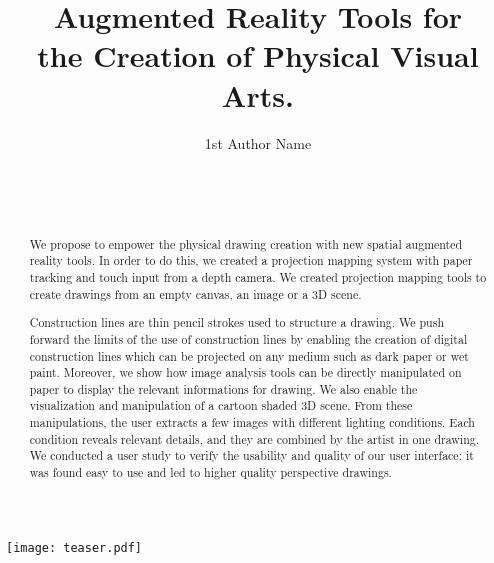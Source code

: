 \documentclass{sigchi}
\begin{document}
\title{Augmented Reality Tools for \\ 
  the Creation of Physical Visual Arts.}

\author{
  \alignauthor 1st Author Name\\
    \\
    \\
    \\
}









\maketitle
 

\vspace{55mm}
\texttt{[image: teaser.pdf]}

\begin{abstract}


We propose to empower the physical drawing creation with 
new spatial augmented reality tools. In order to do this, we created a
projection mapping system with paper tracking and touch input from a
depth camera. We created projection mapping tools to create drawings from
an empty canvas, an image or a 3D scene.

Construction lines are thin pencil strokes used to structure a
drawing. We push forward the limits of the use of construction lines
by enabling the creation of digital construction lines which can be
projected on any medium such as dark paper or wet paint.
Moreover, we show how image analysis tools
can be directly manipulated on paper to display the relevant
informations for drawing. 
We also enable the
visualization and manipulation of a cartoon shaded 3D scene. From these
manipulations, the user extracts a few images with different lighting
conditions. Each condition reveals relevant details, and they are
combined by the artist in one drawing. 
We conducted a user study to verify the usability and quality of our
user interface: it was found easy to use and led to higher quality
 perspective drawings. 

\end{abstract}
\end{document}
